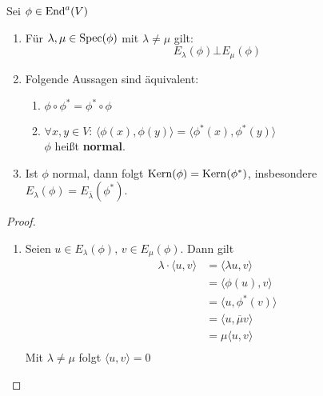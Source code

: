 \documentclass[parskip,a4paper,twoside,DIV15,BCOR12mm]{scrbook}
\begin{document}
\begin{proposition}
Sei \(\phi\in\operatorname{End}^{a}(V)\)
\begin{enumerate}
\item Für \(\lambda,\mu\in\operatorname{Spec}(\phi)\) mit \(\lambda\neq\mu\) gilt:
\[
E_{\lambda}(\phi)\bot E_{\mu}(\phi)
\]
\item Folgende Aussagen sind äquivalent:
    \begin{enumerate}
    \item\(\phi\circ\phi^{*}=\phi^{*}\circ\phi\)
    \item\(\forall x,y\in V:\,\langle\phi(x),\phi(y)\rangle=\langle\phi^{*}(x),\phi^{*}(y)\rangle\)\\
    \(\phi\) heißt \textbf{normal}.
    \end{enumerate}
\item Ist \(\phi\) normal, dann folgt \(\operatorname{Kern}(\phi)=\operatorname{Kern}(\phi^{*})\), 
insbesondere \(E_{\lambda}(\phi)=E_{\overline{\lambda}}(\phi^{*})\).
\end{enumerate}
\end{proposition}
\begin{proof}
\begin{enumerate}
\item Seien \(u\in E_{\lambda}(\phi),\,v\in E_{\mu}(\phi)\). Dann gilt
\begin{align*}
\lambda\cdot\langle u,v\rangle&=\langle\lambda u,v\rangle\\
&=\langle\phi(u),v\rangle\\
&=\langle u,\phi^{*}(v)\rangle\\
&=\langle u,\overline{\mu}v\rangle\\
&=\mu\langle u,v\rangle\\
\end{align*}
Mit \(\lambda\neq\mu\) folgt \(\langle u,v\rangle=0\)
\end{enumerate}
\end{proof}
\end{document}

